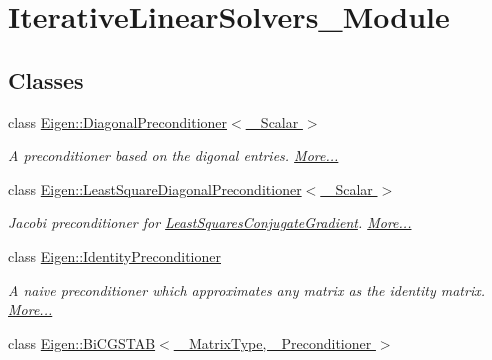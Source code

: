 \hypertarget{group___iterative_linear_solvers___module}{}\section{Iterative\+Linear\+Solvers\+\_\+\+Module}
\label{group___iterative_linear_solvers___module}
\subsection*{Classes}
\begin{DoxyCompactItemize}
\item 
class \hyperlink{group___iterative_linear_solvers___module_class_eigen_1_1_diagonal_preconditioner}{Eigen\+::\+Diagonal\+Preconditioner$<$ \+\_\+\+Scalar $>$}
\begin{DoxyCompactList}\small\item\em A preconditioner based on the digonal entries.  \hyperlink{group___iterative_linear_solvers___module_class_eigen_1_1_diagonal_preconditioner}{More...}\end{DoxyCompactList}\item 
class \hyperlink{group___iterative_linear_solvers___module_class_eigen_1_1_least_square_diagonal_preconditioner}{Eigen\+::\+Least\+Square\+Diagonal\+Preconditioner$<$ \+\_\+\+Scalar $>$}
\begin{DoxyCompactList}\small\item\em Jacobi preconditioner for \hyperlink{group___iterative_linear_solvers___module_class_eigen_1_1_least_squares_conjugate_gradient}{Least\+Squares\+Conjugate\+Gradient}.  \hyperlink{group___iterative_linear_solvers___module_class_eigen_1_1_least_square_diagonal_preconditioner}{More...}\end{DoxyCompactList}\item 
class \hyperlink{group___iterative_linear_solvers___module_class_eigen_1_1_identity_preconditioner}{Eigen\+::\+Identity\+Preconditioner}
\begin{DoxyCompactList}\small\item\em A naive preconditioner which approximates any matrix as the identity matrix.  \hyperlink{group___iterative_linear_solvers___module_class_eigen_1_1_identity_preconditioner}{More...}\end{DoxyCompactList}\item 
class \hyperlink{group___iterative_linear_solvers___module_class_eigen_1_1_bi_c_g_s_t_a_b}{Eigen\+::\+Bi\+C\+G\+S\+T\+A\+B$<$ \+\_\+\+Matrix\+Type, \+\_\+\+Preconditioner $>$}

\end{DoxyCompactItemize}
